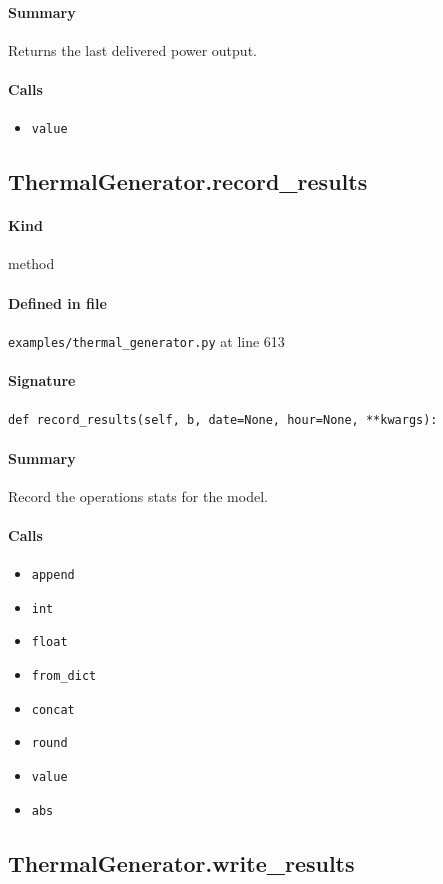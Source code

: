\documentclass[11pt]{report}
\begin{document}
\paragraph{Summary} Returns the last delivered power output.
\paragraph{Calls}
\begin{itemize}[leftmargin=*]
  \item \texttt{value}
\end{itemize}
\subsection{ThermalGenerator.record\_results}
\label{def:examples-thermal_generator.py:ThermalGenerator.record_results:L613}
\paragraph{Kind} method
\paragraph{Defined in file} \texttt{examples/thermal\_generator.py} at line 613
\paragraph{Signature} \texttt{def record\_results(self, b, date=None, hour=None, **kwargs):}
\paragraph{Summary} Record the operations stats for the model.
\paragraph{Calls}
\begin{itemize}[leftmargin=*]
  \item \texttt{append}
  \item \texttt{int}
  \item \texttt{float}
  \item \texttt{from\_dict}
  \item \texttt{concat}
  \item \texttt{round}
  \item \texttt{value}
  \item \texttt{abs}
\end{itemize}
\subsection{ThermalGenerator.write\_results}
\label{def:examples-thermal_generator.py:ThermalGenerator.write_results:L678}
\end{document}
